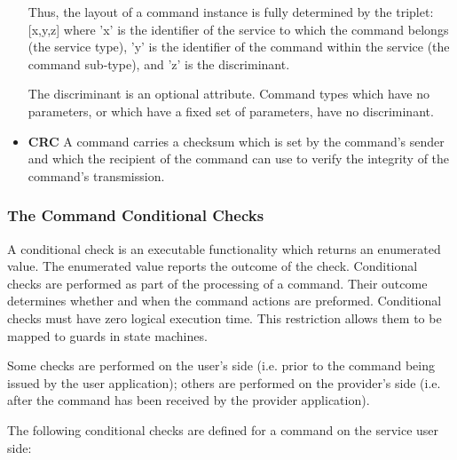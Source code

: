 \begin{itemize}
Thus, the layout of a command instance is fully determined by the triplet: [x,y,z] where 'x' is the identifier of the service to which the command belongs (the service type), 'y' is the identifier of the command within the service (the command sub-type), and 'z' is the discriminant. 

The discriminant is an optional attribute. Command types which have no parameters, or which have a fixed set of parameters, have no discriminant.

\item \textbf{CRC}
A command carries a checksum which is set by the command's sender and which the recipient of the command can use to verify the integrity of the command's transmission. 
\end{itemize}

\subsubsection{The Command Conditional Checks}\label{sec:CmdCondChecks}

A conditional check is an executable functionality which returns an enumerated value. The enumerated value reports the outcome of the check. Conditional checks are performed as part of the processing of a command. Their outcome determines whether and when the command actions are preformed. Conditional checks must have zero logical execution time. This restriction allows them to be mapped to guards in state machines. 

Some checks are performed on the user's side (i.e. prior to the command being issued by the user application); others are performed on the provider's side (i.e. after the command has been received by the provider application). 

The following conditional checks are defined for a command on the service user side:

